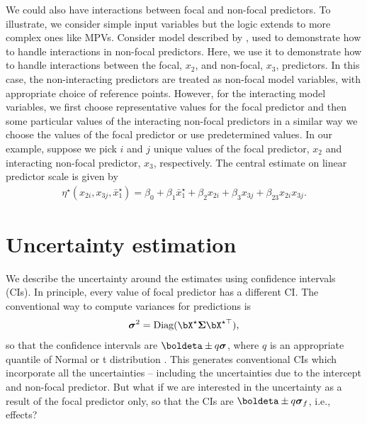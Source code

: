 We could also have interactions between focal and non-focal predictors. To illustrate, we consider simple input variables but the logic extends to more complex ones like MPVs. Consider model described by , used to demonstrate how to handle interactions in non-focal predictors. Here, we use it to demonstrate how to handle interactions between the focal, $x_2$, and non-focal, $x_3$, predictors. In this case, the non-interacting predictors are treated as non-focal model variables, with appropriate choice of reference points. However, for the interacting model variables, we first choose representative values for the focal predictor and then some particular values of the interacting non-focal predictors in a similar way we choose the values of the focal predictor or use predetermined values. In our example, suppose we pick $i$ and $j$ unique values of the focal predictor, $x_2$ and interacting non-focal predictor, $x_3$, respectively. The central estimate on linear predictor scale is given by
%
\begin{align*}
\eta^\star(x_{2i}, x_{3j}, {\bar{x}^\star_1}) = \beta_0 + \beta_1 \bar{x}^\star_1 + \beta_2x_{2i} + \beta_3x_{3j} + \beta_{23}x_{2i}x_{3j}.
\end{align*}
%

\section{Uncertainty estimation}

We describe the uncertainty around the estimates using confidence intervals (CIs). In principle, every value of focal predictor has a different CI. The conventional way to compute variances for predictions is 
%
\begin{align}\label{eq:conventional_variance}
\boldsymbol\sigma^2 = \textrm{Diag}(\bX^\star \boldsymbol{\Sigma} \bX^{\star\top}), 
\end{align}
so that the confidence intervals are $\boldeta \pm q\boldsymbol\sigma$, where $q$ is an appropriate quantile of Normal or t distribution \citep{lenth2018package, fox2009effect}. This generates conventional CIs which incorporate all the uncertainties -- including the uncertainties due to the intercept and non-focal predictor.  But what if we are interested in the uncertainty as a result of the focal predictor only, so that the CIs are $\boldeta \pm q \boldsymbol \sigma_f$, i.e., effects? 

